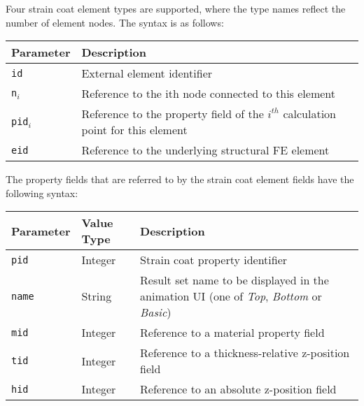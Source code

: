 
Four strain coat element types are supported, where the type names
reflect the number of element nodes. The  syntax is as follows:


\medskip\noindent
\begin{tabular}{| m{} | m{} |}
  \hline
  \rowcolor[HTML]{EFEFEF}
  Parameter & Description \\
  \hline\hline
  {\tt id}  & External element identifier \\
  \hline
  {\tt n$_i$} & Reference to the ith node connected to this element \\
  \hline
  {\tt pid$_i$} & Reference to the property field of the $i^{th}$
                  calculation point for this element \\
  \hline
  {\tt eid} & Reference to the underlying structural FE element \\
  \hline
\end{tabular}



The property fields that are referred to by the strain coat element
fields have the following syntax:


\noindent
\begin{tabular}{| m{} | m{} | m{} |}
  \hline
  \rowcolor[HTML]{EFEFEF}
  Parameter  & Value Type & Description \\
  \hline\hline
  {\tt pid}  & Integer & Strain coat property identifier \\
  \hline
  {\tt name} & String & Result set name to be displayed in the animation UI
                        (one of {\sl Top}, {\sl Bottom} or {\sl Basic}) \\
  \hline
  {\tt mid}  & Integer & Reference to a material property field \\
  \hline
  {\tt tid}  & Integer & Reference to a thickness-relative z-position field \\
  \hline
  {\tt hid}  & Integer & Reference to an absolute z-position field \\
  \hline
\end{tabular}

